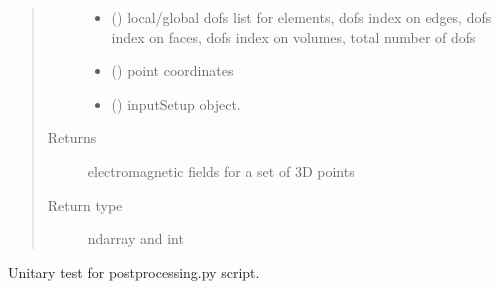 \documentclass[letterpaper,10pt,english]{sphinxmanual}
\begin{document}
\begin{fulllineitems}
\begin{quote}
\begin{description}
\begin{itemize}
\item {} 
 () \textendash{} local/global dofs list for elements, dofs index on edges, dofs index on faces, dofs index on volumes, total number of dofs

\item {} 
 () \textendash{} point coordinates

\item {} 
 () \textendash{} inputSetup object.

\end{itemize}

\item[{Returns}] \leavevmode
electromagnetic fields for a set of 3D points

\item[{Return type}] \leavevmode
ndarray and int

\end{description}\end{quote}

\end{fulllineitems}


\begin{fulllineitems}
\label{\detokenize{petgem/postprocessing:petgem.postprocessing.unitary_test}}
Unitary test for postprocessing.py script.

\end{fulllineitems}
\end{document}
